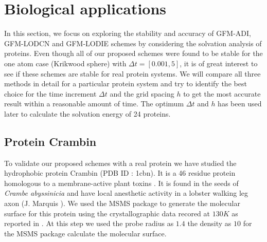    
\section{Biological applications}

In this section, we focus on exploring the stability and accuracy of GFM-ADI, GFM-LODCN and GFM-LODIE schemes by considering the solvation analysis of proteins. Even though all of our proposed schemes were found to be stable for the one atom case (Krikwood sphere) with $\Delta t =[0.001,5]$, it is of great interest to see if these schemes are stable for real protein systems. We will compare all three methods in detail for a particular protein system and try to identify the best choice for the time increment $\Delta t $ and the grid spacing $h$ to get the most accurate result within a reasonable amount of time. The optimum $\Delta t$ and $h$ has been used later to calculate the solvation energy of 24 proteins.      

\subsection{Protein Crambin } To validate our proposed schemes with a real protein we have studied the hydrophobic protein Crambin (PDB ID : 1cbn). It is a 46 residue protein homologous to a membrane-active plant toxins \cite{1cbn_paper}. It is found in the seeds of \textit{Crambe abyssinicia} and have local anesthetic activity in a lobster walking leg axon (J. Marquis \cite{1cbn_paper}). We used the MSMS package to generate the molecular surface for this protein using the crystallographic data recored at $130 K$ as reported in \cite{1cbn_paper}. At this step we used the probe radius as $1.4$ the density as $10$ for the MSMS package calculate the molecular surface.

